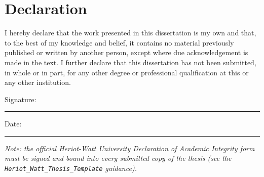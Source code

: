 \chapter*{Declaration}

I hereby declare that the work presented in this dissertation is my own and
that, to the best of my knowledge and belief, it contains no material
previously published or written by another person, except where due
acknowledgement is made in the text. I further declare that this dissertation
has not been submitted, in whole or in part, for any other degree or
professional qualification at this or any other institution.

\vspace{1.5cm}
Signature: \rule{6cm}{0.4pt} \hfill Date: \rule{4cm}{0.4pt}

\vspace{2cm}
{\small\itshape Note: the official Heriot-Watt University Declaration of
Academic Integrity form must be signed and bound into every submitted copy of
the thesis (see the \texttt{Heriot\_Watt\_Thesis\_Template} guidance).}
